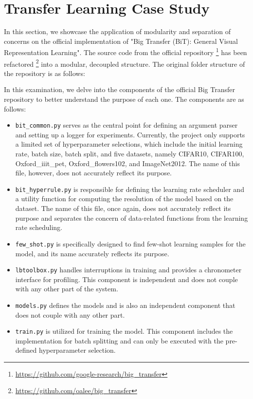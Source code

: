 \section{Transfer Learning Case Study}

In this section, we showcase the application of modularity and separation of concerns on the official implementation of "Big Transfer (BiT): General Visual Representation Learning"\cite{transferlearning}. The source code from the official repository \footnote{\url{https://github.com/google-research/big_transfer}} has been refactored \footnote{\url{https://github.com/oalee/big_transfer}} into a modular, decoupled structure.  The original folder structure of the repository is as follows:

\vspace{0.4em}
In this examination, we delve into the components of the official Big Transfer repository to better understand the purpose of each one. The components are as follows:

\begin{itemize}
    \item \texttt{bit\_common.py} serves as the central point for defining an argument parser and setting up a logger for experiments. Currently, the project only supports a limited set of hyperparameter selections, which include the initial learning rate, batch size, batch split, and five datasets, namely CIFAR10, CIFAR100, Oxford\_iiit\_pet, Oxford\_flowers102, and ImageNet2012. The name of this file, however, does not accurately reflect its purpose.
    \item \texttt{bit\_hyperrule.py} is responsible for defining the learning rate scheduler and a utility function for computing the resolution of the model based on the dataset. The name of this file, once again, does not accurately reflect its purpose and separates the concern of data-related functions from the learning rate scheduling.
    \item \texttt{few\_shot.py} is specifically designed to find few-shot learning samples for the model, and its name accurately reflects its purpose.
    \item \texttt{lbtoolbox.py} handles interruptions in training and provides a chronometer interface for profiling. This component is independent and does not couple with any other part of the system.
    \item \texttt{models.py} defines the models and is also an independent component that does not couple with any other part.
    \item \texttt{train.py} is utilized for training the model. This component includes the implementation for batch splitting and can only be executed with the pre-defined hyperparameter selection.
\end{itemize}


